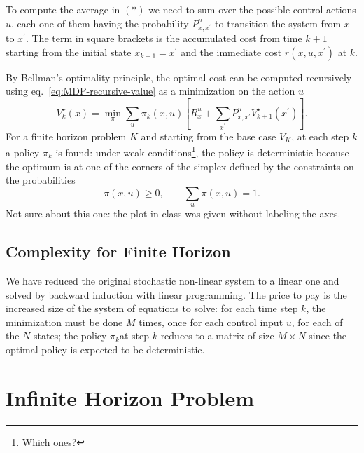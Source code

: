 To compute the average in $(*)$ we need to sum over the possible control actions $u$, each one of them having the probability $P_{x,x^\prime}^u$ to transition the system from $x$ to $x^\prime$. The term in square brackets is the accumulated cost from time $k+1$ starting from the initial state $x_{k+1}=x^\prime$ and the immediate cost $r(x,u,x^\prime)$ at $k$.

By Bellman's optimality principle, the optimal cost can be computed recursively using eq.~\eqref{eq:MDP-recursive-value} as a minimization on the action $u$
\begin{equation*}
  V_k^\star(x) = \min_\pi \sum_u \pi_k(x,u)\left[R^u_x + \sum_{x^\prime}P_{x,x^\prime}^u V^\star_{k+1}(x^\prime)\right].
\end{equation*}
For a finite horizon problem $K$ and starting from the base case $V_K$, at each step $k$ a policy $\pi_k$ is found: under weak conditions\footnote{Which ones?}, the policy is deterministic because the optimum is at one of the corners of the simplex defined by the constraints on the probabilities
\begin{equation*}
  \pi(x,u) \ge 0,\qquad \sum_u \pi(x,u) = 1.
\end{equation*}
Not sure about this one: the plot in class was given without labeling the axes.

\subsection{Complexity for Finite Horizon}
\label{sec:MDP-complexity-finite-horizon}

We have reduced the original stochastic non-linear system to a linear one and solved by backward induction with linear programming. The price to pay is the increased size of the system of equations to solve: for each time step $k$, the minimization must be done $M$ times, once for each control input $u$, for each of the $N$ states; the policy $\pi_k$at step $k$ reduces to a matrix of size $M\times N$ since the optimal policy is expected to be deterministic.


\section{Infinite Horizon Problem}
\label{sec:MDP-infinite-horizon}

